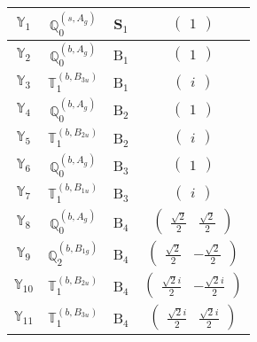 \documentclass[fleqn,10pt,landscape]{article}
\begin{document}
\begin{itemize}
\begin{center}
\begin{longtable}{c|c|c|c}
$ \mathbb{Y}_{1} $ & $\mathbb{Q}_{0}^{(s,A_{g})}$ & S$_{1}$ & $\begin{pmatrix} 1 \end{pmatrix}$ \\ \hline
$ \mathbb{Y}_{2} $ & $\mathbb{Q}_{0}^{(b,A_{g})}$ & B$_{1}$ & $\begin{pmatrix} 1 \end{pmatrix}$ \\
$ \mathbb{Y}_{3} $ & $\mathbb{T}_{1}^{(b,B_{3u})}$ & B$_{1}$ & $\begin{pmatrix} i \end{pmatrix}$ \\ \hline
$ \mathbb{Y}_{4} $ & $\mathbb{Q}_{0}^{(b,A_{g})}$ & B$_{2}$ & $\begin{pmatrix} 1 \end{pmatrix}$ \\
$ \mathbb{Y}_{5} $ & $\mathbb{T}_{1}^{(b,B_{2u})}$ & B$_{2}$ & $\begin{pmatrix} i \end{pmatrix}$ \\ \hline
$ \mathbb{Y}_{6} $ & $\mathbb{Q}_{0}^{(b,A_{g})}$ & B$_{3}$ & $\begin{pmatrix} 1 \end{pmatrix}$ \\
$ \mathbb{Y}_{7} $ & $\mathbb{T}_{1}^{(b,B_{1u})}$ & B$_{3}$ & $\begin{pmatrix} i \end{pmatrix}$ \\ \hline
$ \mathbb{Y}_{8} $ & $\mathbb{Q}_{0}^{(b,A_{g})}$ & B$_{4}$ & $\begin{pmatrix} \frac{\sqrt{2}}{2} & \frac{\sqrt{2}}{2} \end{pmatrix}$ \\
$ \mathbb{Y}_{9} $ & $\mathbb{Q}_{2}^{(b,B_{1g})}$ & B$_{4}$ & $\begin{pmatrix} \frac{\sqrt{2}}{2} & - \frac{\sqrt{2}}{2} \end{pmatrix}$ \\
$ \mathbb{Y}_{10} $ & $\mathbb{T}_{1}^{(b,B_{2u})}$ & B$_{4}$ & $\begin{pmatrix} \frac{\sqrt{2} i}{2} & - \frac{\sqrt{2} i}{2} \end{pmatrix}$ \\
$ \mathbb{Y}_{11} $ & $\mathbb{T}_{1}^{(b,B_{3u})}$ & B$_{4}$ & $\begin{pmatrix} \frac{\sqrt{2} i}{2} & \frac{\sqrt{2} i}{2} \end{pmatrix}$ \\
\end{longtable}
\end{center}


\end{itemize}
\end{document}
